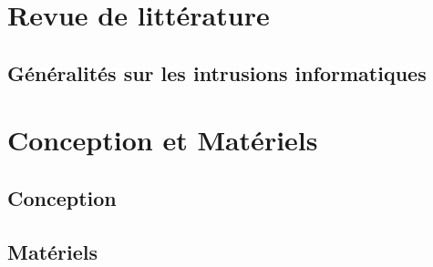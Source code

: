 \documentclass{ifri}
\begin{document}
\pageDeGarde

\pagecolor{white}




\tableofcontents
\newpage

\listoffigures 

\listoftables


\printglossary[title=Sigles et Abréviations, toctitle=Sigles et Abréviations, type=\acronymtype]

\printglossary[type=main]









\setcounter{page}{1}

\fancyhead[L]{\tiny \leftmark}
\fancyhead[R]{\scriptsize \rightmark}
\fancyfoot[C]{\thepage}

\chapter{Revue de littérature}\label{chap:1}
  
  \section{Généralités sur les intrusions informatiques}
  
 
\chapter{Conception et Matériels}\label{chap:2}
  
  \section{Conception}
    
  \section{Matériels}
    
 
\end{document}
